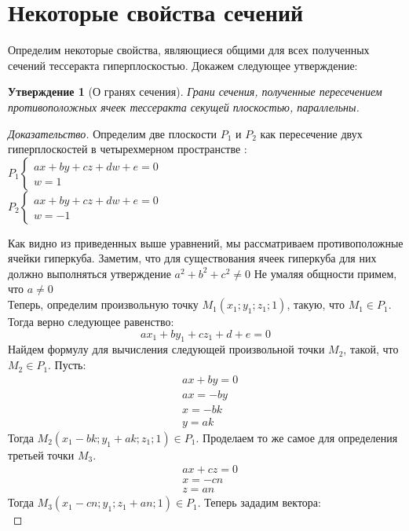 \documentclass[12pt, a4paper, twoside]{report}
\newtheorem{lem}{Утверждение} %
\begin{document}
\section{Некоторые свойства сечений}
Определим некоторые свойства, являющиеся общими для всех полученных сечений тессеракта гиперплоскостью. Докажем следующее утверждение:
\begin{lem}[О гранях сечения]
Грани сечения, полученные пересечением противоположных ячеек тессеракта секущей плоскостью, параллельны.	
\end{lem}
\begin{proof}[Доказательство] 
	Определим две плоскости $P_1$ и $P_2$ как пересечение двух гиперплоскостей в четырехмерном пространстве : \\

$
\begin{equation}
	P_1 \left\{
		\begin{array}{lc}
			ax+by+cz+dw+e=0 \\
			w=1
		\end{array}
\end{equation}
$
\\

$
\begin{equation}
	P_2 \left\{
		\begin{array}{lc}
			ax+by+cz+dw+e=0 \\
			w=-1
		\end{array}
	\end{equation}
$

Как видно из приведенных выше уравнений, мы рассматриваем противоположные ячейки гиперкуба. 
Заметим, что для существования ячеек гиперкуба для них должно выполняться утверждение $a^2+b^2+c^2\ne0$ 
Не умаляя общности примем, что $a\ne 0$ \\
Теперь, определим произвольную точку $M_1(x_1;y_1;z_1;1)$, такую, что $M_1\in P_1$. Тогда верно следующее равенство:
$$
ax_1+by_1+cz_1+d+e=0
$$
Найдем формулу для вычисления следующей произвольной точки $M_2$, такой, что $M_2 \in P_1$. Пусть: \\
\begin{align*}
	&ax+by=0 \\ 
&ax=-by \\
&x=-bk \\
&y=ak 
\end{align*}
Тогда $M_2(x_1-bk;y_1+ak;z_1;1) \in P_1.$ Проделаем то же самое для определения третьей точки $M_3$. \\
\begin{align*}
	&ax+cz=0 \\
 &x=-cn \\
 &z=an
\end{align*}
Тогда $M_3(x_1-cn;y_1;z_1+an;1) \in P_1$. 
\newpage
Теперь зададим вектора:\\ 


\end{proof}
\end{document}
